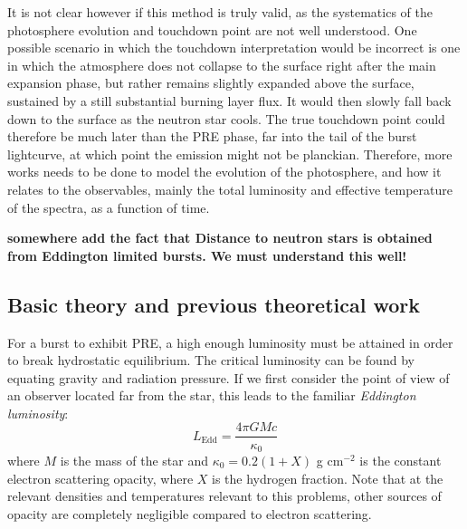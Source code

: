 \documentclass[../main.tex]{subfiles}
\newcommand{\Ledd}{L_\text{Edd}}
\begin{document}
It is not clear however if this method is truly valid, as the systematics of the photosphere evolution and touchdown point are not well understood. One possible scenario in which the touchdown interpretation would be incorrect is one in which the atmosphere does not collapse to the surface right after the main expansion phase, but rather remains slightly expanded above the surface, sustained by a still substantial burning layer flux. It would then slowly fall back down to the surface as the neutron star cools. The true touchdown point could therefore be much later than the PRE phase, far into the tail of the burst lightcurve, at which point the emission might not be planckian. Therefore, more works needs to be done to model the evolution of the photosphere, and how it relates to the observables, mainly the total luminosity and effective temperature of the spectra, as a function of time.

\textbf{somewhere add the fact that Distance to neutron stars is obtained from Eddington limited bursts. We must understand this well!}


\subsection{Basic theory and previous theoretical work}
For a burst to exhibit PRE, a high enough luminosity must be attained in order to break hydrostatic equilibrium. The critical luminosity can be found by equating gravity and radiation pressure.  If we first consider the point of view of an observer located far from the star, this leads to the familiar \textit{Eddington luminosity}:
\begin{equation}\label{eq:LEdd}
    \Ledd = \frac{4\pi GMc}{\kappa_0}
\end{equation}
where $M$ is the mass of the star and $\kappa_0=0.2(1+X)$ g cm$^{-2}$ is the constant electron scattering opacity, where $X$ is the hydrogen fraction. Note that at the relevant densities and temperatures relevant to this problems, other sources of opacity are completely negligible compared to electron scattering. \\
\end{document}
